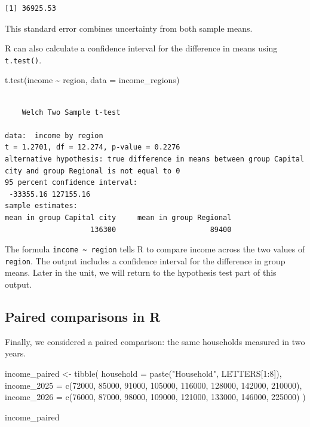 \documentclass[
  letterpaper,
  DIV=11,
  numbers=noendperiod]{scrreprt}
\newenvironment{Shaded}{\begin{snugshade}}{\end{snugshade}}
\newcommand{\AttributeTok}[1]{\textcolor[rgb]{0.40,0.45,0.13}{#1}}
\newcommand{\DecValTok}[1]{\textcolor[rgb]{0.68,0.00,0.00}{#1}}
\newcommand{\FunctionTok}[1]{\textcolor[rgb]{0.28,0.35,0.67}{#1}}
\newcommand{\NormalTok}[1]{\textcolor[rgb]{0.00,0.23,0.31}{#1}}
\newcommand{\OtherTok}[1]{\textcolor[rgb]{0.00,0.23,0.31}{#1}}
\newcommand{\SpecialCharTok}[1]{\textcolor[rgb]{0.37,0.37,0.37}{#1}}
\newcommand{\StringTok}[1]{\textcolor[rgb]{0.13,0.47,0.30}{#1}}
\begin{document}
\begin{verbatim}
[1] 36925.53
\end{verbatim}

This standard error combines uncertainty from both sample means.

R can also calculate a confidence interval for the difference in means
using \texttt{t.test()}.

\begin{Shaded}
\begin{Highlighting}[]
\FunctionTok{t.test}\NormalTok{(income }\SpecialCharTok{\textasciitilde{}}\NormalTok{ region, }\AttributeTok{data =}\NormalTok{ income\_regions)}
\end{Highlighting}
\end{Shaded}

\begin{verbatim}

    Welch Two Sample t-test

data:  income by region
t = 1.2701, df = 12.274, p-value = 0.2276
alternative hypothesis: true difference in means between group Capital city and group Regional is not equal to 0
95 percent confidence interval:
 -33355.16 127155.16
sample estimates:
mean in group Capital city     mean in group Regional 
                    136300                      89400 
\end{verbatim}

The formula \texttt{income\ \textasciitilde{}\ region} tells R to
compare income across the two values of \texttt{region}. The output
includes a confidence interval for the difference in group means. Later
in the unit, we will return to the hypothesis test part of this output.

\subsection{Paired comparisons in R}\label{paired-comparisons-in-r}

Finally, we considered a paired comparison: the same households measured
in two years.

\begin{Shaded}
\begin{Highlighting}[]
\NormalTok{income\_paired }\OtherTok{\textless{}{-}} \FunctionTok{tibble}\NormalTok{(}
  \AttributeTok{household =} \FunctionTok{paste}\NormalTok{(}\StringTok{"Household"}\NormalTok{, LETTERS[}\DecValTok{1}\SpecialCharTok{:}\DecValTok{8}\NormalTok{]),}
  \AttributeTok{income\_2025 =} \FunctionTok{c}\NormalTok{(}\DecValTok{72000}\NormalTok{, }\DecValTok{85000}\NormalTok{, }\DecValTok{91000}\NormalTok{, }\DecValTok{105000}\NormalTok{, }\DecValTok{116000}\NormalTok{, }\DecValTok{128000}\NormalTok{, }\DecValTok{142000}\NormalTok{, }\DecValTok{210000}\NormalTok{),}
  \AttributeTok{income\_2026 =} \FunctionTok{c}\NormalTok{(}\DecValTok{76000}\NormalTok{, }\DecValTok{87000}\NormalTok{, }\DecValTok{98000}\NormalTok{, }\DecValTok{109000}\NormalTok{, }\DecValTok{121000}\NormalTok{, }\DecValTok{133000}\NormalTok{, }\DecValTok{146000}\NormalTok{, }\DecValTok{225000}\NormalTok{)}
\NormalTok{)}

\NormalTok{income\_paired}
\end{Highlighting}
\end{Shaded}
\end{document}
